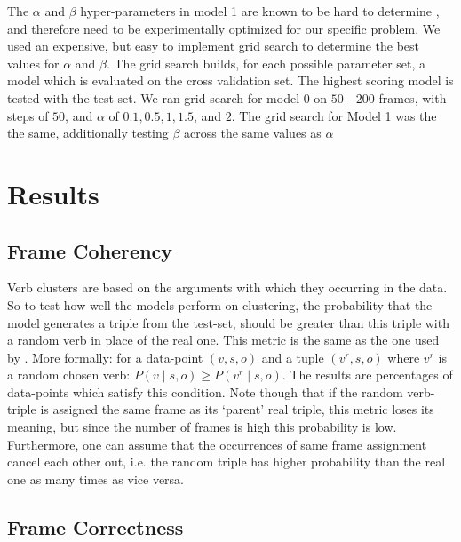 \documentclass{article} %
\begin{document}
The $\alpha$ and $\beta$ hyper-parameters in model 1 are known  to be hard to determine \citep{oconnor2013}, and therefore need to be experimentally optimized for our specific problem. We used an expensive, but easy to implement grid search to determine the best values for $\alpha$ and $\beta$. The grid search builds, for each possible parameter set, a model which is evaluated on the cross validation set. The highest scoring model is tested with the test set. We ran grid search for model 0 on $50$ - $200$ frames, with steps of $50$, and $\alpha$ of $0.1, 0.5, 1, 1.5$, and $2$. The grid search for Model 1 was the the same, additionally testing $\beta$ across the same values as $\alpha$
\section{Results}
\label{results}

\subsection{Frame Coherency}
Verb clusters are based on the arguments with which they occurring in the data. So to test how well the models perform on clustering, the probability that the model generates a triple from the test-set, should be greater than this triple with a random verb in place of the real one. This metric is the same as the one used by \citeauthor{rooth1999}. More formally: for a data-point $(v,s,o)$ and a tuple $(v^r,s,o)$ where $v^r$ is a random chosen verb: $P(v\mid s,o) \geq P(v^r\mid s,o)$.
The results are percentages of data-points which satisfy this condition. Note though that if the random verb-triple is assigned the same frame as its `parent' real triple, this metric loses its meaning, but since the number of frames is high this probability is low. Furthermore, one can assume that the occurrences of same frame assignment cancel each other out, i.e. the random triple has higher probability than the real one as many times as vice versa.

\subsection{Frame Correctness}
\end{document}
